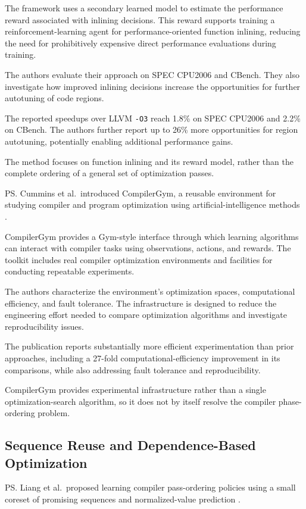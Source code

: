 \me{} The framework uses a secondary learned model to estimate the performance reward associated with inlining decisions. This reward supports training a reinforcement-learning agent for performance-oriented function inlining, reducing the need for prohibitively expensive direct performance evaluations during training.

The authors evaluate their approach on SPEC CPU2006 and CBench. They also investigate how improved inlining decisions increase the opportunities for further autotuning of code regions.

\re{} The reported speedups over LLVM \texttt{-O3} reach 1.8\% on SPEC CPU2006 and 2.2\% on CBench. The authors further report up to 26\% more opportunities for region autotuning, potentially enabling additional performance gains.

\rg{} The method focuses on function inlining and its reward model, rather than the complete ordering of a general set of optimization passes.

\ps{} Cummins et al.\ introduced CompilerGym, a reusable environment for studying compiler and program optimization using artificial-intelligence methods \cite{cummins2022compilergym}.

\me{} CompilerGym provides a Gym-style interface through which learning algorithms can interact with compiler tasks using observations, actions, and rewards. The toolkit includes real compiler optimization environments and facilities for conducting repeatable experiments.

The authors characterize the environment's optimization spaces, computational efficiency, and fault tolerance. The infrastructure is designed to reduce the engineering effort needed to compare optimization algorithms and investigate reproducibility issues.

\re{} The publication reports substantially more efficient experimentation than prior approaches, including a 27-fold computational-efficiency improvement in its comparisons, while also addressing fault tolerance and reproducibility.

\rg{} CompilerGym provides experimental infrastructure rather than a single optimization-search algorithm, so it does not by itself resolve the compiler phase-ordering problem.

\subsection{Sequence Reuse and Dependence-Based Optimization}
\ps{} Liang et al.\ proposed learning compiler pass-ordering policies using a small coreset of promising sequences and normalized-value prediction \cite{liang2023coreset}.

